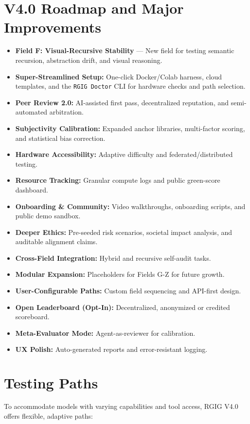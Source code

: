 \documentclass[11pt]{article}
\begin{document}
\section*{V4.0 Roadmap and Major Improvements}
\begin{itemize}
  \item \textbf{Field F: Visual-Recursive Stability} — New field for testing semantic recursion, abstraction drift, and visual reasoning.
  \item \textbf{Super-Streamlined Setup:} One-click Docker/Colab harness, cloud templates, and the \texttt{RGIG Doctor} CLI for hardware checks and path selection.
  \item \textbf{Peer Review 2.0:} AI-assisted first pass, decentralized reputation, and semi-automated arbitration.
  \item \textbf{Subjectivity Calibration:} Expanded anchor libraries, multi-factor scoring, and statistical bias correction.
  \item \textbf{Hardware Accessibility:} Adaptive difficulty and federated/distributed testing.
  \item \textbf{Resource Tracking:} Granular compute logs and public green-score dashboard.
  \item \textbf{Onboarding \& Community:} Video walkthroughs, onboarding scripts, and public demo sandbox.
  \item \textbf{Deeper Ethics:} Pre-seeded risk scenarios, societal impact analysis, and auditable alignment claims.
  \item \textbf{Cross-Field Integration:} Hybrid and recursive self-audit tasks.
  \item \textbf{Modular Expansion:} Placeholders for Fields G-Z for future growth.
  \item \textbf{User-Configurable Paths:} Custom field sequencing and API-first design.
  \item \textbf{Open Leaderboard (Opt-In):} Decentralized, anonymized or credited scoreboard.
  \item \textbf{Meta-Evaluator Mode:} Agent-as-reviewer for calibration.
  \item \textbf{UX Polish:} Auto-generated reports and error-resistant logging.
\end{itemize}

\section*{Testing Paths}
To accommodate models with varying capabilities and tool access, RGIG V4.0 offers flexible, adaptive paths:
\end{document}
